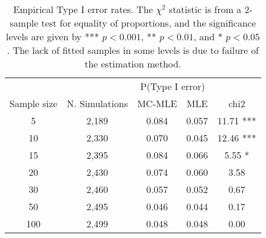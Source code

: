\begin{table}[ht]
\centering
\begin{tabular}{ccccc}
\toprule & & \multicolumn{2}{c}{P(Type I error)} \\ \cmidrule(r){3-4}
Sample size & N. Simulations & MC-MLE & MLE & chi2 \\ 
  \midrule
5 & 2,189 & 0.084 & 0.057 & 11.71 *** \\ 
  10 & 2,330 & 0.070 & 0.045 & 12.46 *** \\ 
  15 & 2,395 & 0.084 & 0.066 & 5.55 * \\ 
  20 & 2,430 & 0.074 & 0.060 & 3.58  \\ 
  30 & 2,460 & 0.057 & 0.052 & 0.67  \\ 
  50 & 2,495 & 0.046 & 0.044 & 0.17  \\ 
  100 & 2,499 & 0.048 & 0.048 & 0.00  \\ 
   \bottomrule
\end{tabular}
\caption{\label{tab:typeI}Empirical Type I error rates. The $\chi^2$ statistic is from a 2-sample test for equality of proportions, and the significance levels are given by *** $p < 0.001$, ** $p < 0.01$, and * $p < 0.05$. The lack of fitted samples in some levels is due to failure of the estimation method.} 
\end{table}
